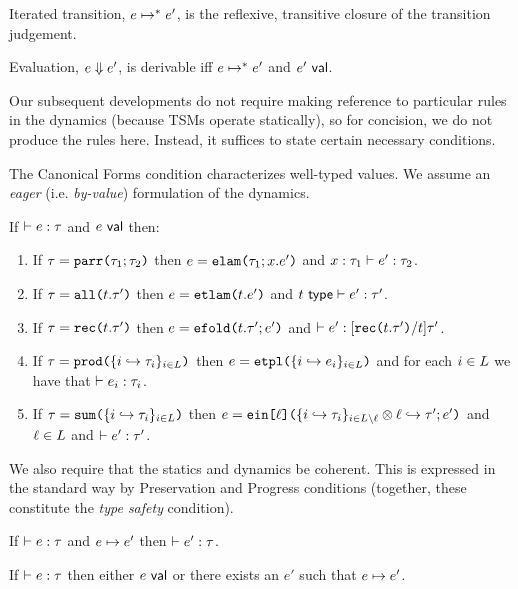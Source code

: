 \begin{definition} Iterated transition, $e \mapsto^{*} e'$, is the reflexive, transitive closure of the transition judgement.\end{definition}

\begin{definition}[Evaluation] Evaluation, $e \Downarrow e'$, is derivable iff $e \mapsto^{*} e'$ and $e'~\mathsf{val}$. \end{definition}

Our subsequent developments do not require making reference to particular rules in the dynamics (because TSMs operate statically), so for concision, we do not produce the rules here. Instead, it suffices to state certain necessary conditions.

The Canonical Forms condition characterizes well-typed values. We assume an \emph{eager} (i.e. \emph{by-value}) formulation of the dynamics. 
\begin{condition}\label{condition:canonical-forms-U} If $\vdash e : \tau$ and $e~\mathsf{val}$ then:
\begin{enumerate}
\item If $\tau=\texttt{parr}\texttt{(}\tau_1; \tau_2\texttt{)}$ then $e=\texttt{elam}\texttt{(}\tau_1; x.e'\texttt{)}$ and $x : \tau_1 \vdash e' : \tau_2$.
\item If $\tau=\texttt{all}\texttt{(}t.\tau'\texttt{)}$ then $e=\texttt{etlam}\texttt{(}t.e'\texttt{)}$ and $t~\mathsf{type} \vdash e' : \tau'$.
\item If $\tau=\texttt{rec}\texttt{(}t.\tau'\texttt{)}$ then $e=\texttt{efold}\texttt{(}t.\tau'; e'\texttt{)}$ and $\vdash e' : [\texttt{rec}\texttt{(}t.\tau'\texttt{)}/t]\tau'$. 
\item If $\tau=\texttt{prod}\texttt{(}\{i \hookrightarrow \tau_{i}\}_{i \in L}\texttt{)}$ then $e=\texttt{etpl}\texttt{(}\{i \hookrightarrow e_{i}\}_{i \in L}\texttt{)}$ and for each $i \in L$ we have that $\vdash e_i : \tau_i$.
\item If $\tau=\texttt{sum}\texttt{(}\{i \hookrightarrow \tau_{i}\}_{i \in L}\texttt{)}$ then $e=\texttt{ein}\texttt{[}\ell\texttt{](}\{i \hookrightarrow \tau_{i}\}_{i \in L\setminus \ell} \otimes \ell \hookrightarrow \tau'; e'\texttt{)}$ and $\ell \in L$ and $\vdash e' : \tau'$.
\end{enumerate}\end{condition}

We also require that the statics and dynamics be coherent. This is expressed in the standard way by Preservation and Progress conditions (together, these constitute the \emph{type safety} condition). 
\begin{condition}[Preservation]\label{condition:preservation-U} If $\vdash e : \tau$ and $e \mapsto e'$ then $\vdash e' : \tau$. \end{condition}
\begin{condition}[Progress]\label{condition:progress-U} If $\vdash e : \tau$ then either $e~\mathsf{val}$ or there exists an $e'$ such that $e \mapsto e'$. \end{condition}


